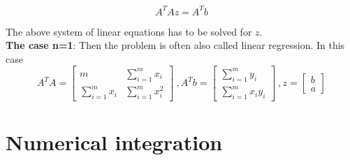 \documentclass[margin=0px]{article}
\begin{document}
\begin{displaymath}
    A^{T}Az = A^{T}b
\end{displaymath}

\noindent The above system of linear equations has to be solved for $z$.\\

\noindent \textbf{The case n=1}: Then the problem is often also called linear regression. In this case
\begin{displaymath}
    A^{T}A = \begin{bmatrix}
        m                    & \sum_{i=1}^{m} x_{i}     \\[0.3em]
        \sum_{i=1}^{m} x_{i} & \sum_{i=1}^{m} x_{i}^{2}
    \end{bmatrix} \ ,
    A^{T}b = \begin{bmatrix}
        \sum_{i=1}^{m} y_{i} \\[0.3em]
        \sum_{i=1}^{m} x_{i}y_ {i}
    \end{bmatrix} \ ,
    z= \begin{bmatrix}
        b \\[0.3em]
        a
    \end{bmatrix}
\end{displaymath}

\section{Numerical integration}


\end{document}

